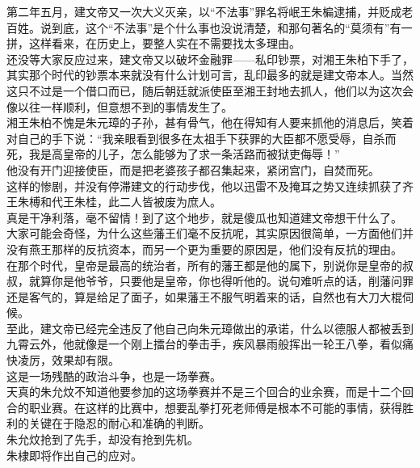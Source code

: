 \begin{multicols}{\theparacolNo}
第二年五月，建文帝又一次大义灭亲，以“不法事”罪名将岷王朱楄逮捕，并贬成老百姓。说到底，这个“不法事”是个什么事也没说清楚，和那句著名的“莫须有”有一拼，这样看来，在历史上，要整人实在不需要找太多理由。\\

还没等大家反应过来，建文帝又以破坏金融罪——私印钞票，对湘王朱柏下手了，其实那个时代的钞票本来就没有什么计划可言，乱印最多的就是建文帝本人。当然这只不过是一个借口而已，随后朝廷就派使臣至湘王封地去抓人，他们以为这次会像以往一样顺利，但意想不到的事情发生了。\\

湘王朱柏不愧是朱元璋的子孙，甚有骨气，他在得知有人要来抓他的消息后，笑着对自己的手下说：“我亲眼看到很多在太祖手下获罪的大臣都不愿受辱，自杀而死，我是高皇帝的儿子，怎么能够为了求一条活路而被狱吏侮辱！”\\

他没有开门迎接使臣，而是把老婆孩子都召集起来，紧闭宫门，自焚而死。\\

这样的惨剧，并没有停滞建文的行动步伐，他以迅雷不及掩耳之势又连续抓获了齐王朱榑和代王朱桂，此二人皆被废为庶人。\\

真是干净利落，毫不留情！到了这个地步，就是傻瓜也知道建文帝想干什么了。\\

大家可能会奇怪，为什么这些藩王们毫不反抗呢，其实原因很简单，一方面他们并没有燕王那样的反抗资本，而另一个更为重要的原因是，他们没有反抗的理由。\\

在那个时代，皇帝是最高的统治者，所有的藩王都是他的属下，别说你是皇帝的叔叔，就算你是他爷爷，只要他是皇帝，你也得听他的。说句难听点的话，削藩问罪还是客气的，算是给足了面子，如果藩王不服气明着来的话，自然也有大刀大棍伺候。\\

至此，建文帝已经完全违反了他自己向朱元璋做出的承诺，什么以德服人都被丢到九霄云外，他就像是一个刚上擂台的拳击手，疾风暴雨般挥出一轮王八拳，看似痛快凌厉，效果却有限。\\

这是一场残酷的政治斗争，也是一场拳赛。\\

天真的朱允炆不知道他要参加的这场拳赛并不是三个回合的业余赛，而是十二个回合的职业赛。在这样的比赛中，想要乱拳打死老师傅是根本不可能的事情，获得胜利的关键在于隐忍的耐心和准确的判断。\\

朱允炆抢到了先手，却没有抢到先机。\\

朱棣即将作出自己的应对。\\
\ifnum{}
	\end{multicols}
\fi
\newpage
